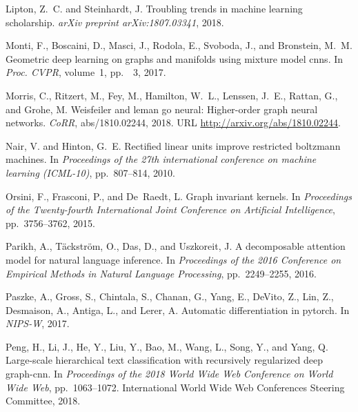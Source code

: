 \documentclass{article}
\begin{document}
\begin{thebibliography}{57}
Lipton, Z.~C. and Steinhardt, J.
\newblock Troubling trends in machine learning scholarship.
\newblock \emph{arXiv preprint arXiv:1807.03341}, 2018.

Monti, F., Boscaini, D., Masci, J., Rodola, E., Svoboda, J., and Bronstein,
  M.~M.
\newblock Geometric deep learning on graphs and manifolds using mixture model
  cnns.
\newblock In \emph{Proc. CVPR}, volume~1, pp.\ ~3, 2017.

Morris, C., Ritzert, M., Fey, M., Hamilton, W.~L., Lenssen, J.~E., Rattan, G.,
  and Grohe, M.
\newblock Weisfeiler and leman go neural: Higher-order graph neural networks.
\newblock \emph{CoRR}, abs/1810.02244, 2018.
\newblock URL \url{http://arxiv.org/abs/1810.02244}.

Nair, V. and Hinton, G.~E.
\newblock Rectified linear units improve restricted boltzmann machines.
\newblock In \emph{Proceedings of the 27th international conference on machine
  learning (ICML-10)}, pp.\  807--814, 2010.

Orsini, F., Frasconi, P., and De~Raedt, L.
\newblock Graph invariant kernels.
\newblock In \emph{Proceedings of the Twenty-fourth International Joint
  Conference on Artificial Intelligence}, pp.\  3756--3762, 2015.

Parikh, A., T{\"a}ckstr{\"o}m, O., Das, D., and Uszkoreit, J.
\newblock A decomposable attention model for natural language inference.
\newblock In \emph{Proceedings of the 2016 Conference on Empirical Methods in
  Natural Language Processing}, pp.\  2249--2255, 2016.

Paszke, A., Gross, S., Chintala, S., Chanan, G., Yang, E., DeVito, Z., Lin, Z.,
  Desmaison, A., Antiga, L., and Lerer, A.
\newblock Automatic differentiation in pytorch.
\newblock In \emph{NIPS-W}, 2017.

Peng, H., Li, J., He, Y., Liu, Y., Bao, M., Wang, L., Song, Y., and Yang, Q.
\newblock Large-scale hierarchical text classification with recursively
  regularized deep graph-cnn.
\newblock In \emph{Proceedings of the 2018 World Wide Web Conference on World
  Wide Web}, pp.\  1063--1072. International World Wide Web Conferences
  Steering Committee, 2018.


\end{thebibliography}
\end{document}
